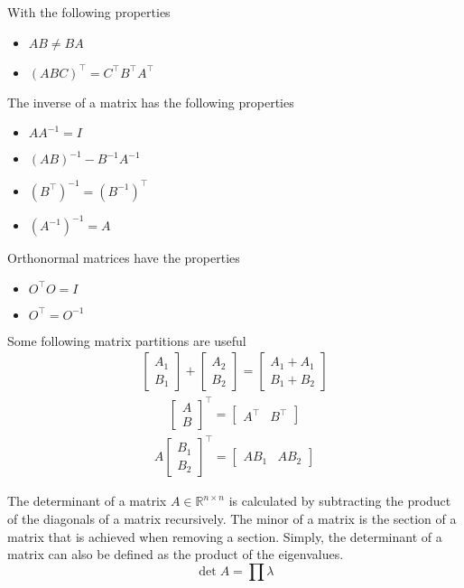 With the following properties
\begin{itemize}
  \item $AB \neq BA$
  \item $(ABC)^\top = C^\top B^\top A^\top $
\end{itemize}
The inverse of a matrix has the following properties
\begin{itemize}
  \item $AA^{-1} = I$
  \item $(AB)^{-1} - B^{-1} A^{-1}$
  \item $(B^\top)^{-1} = (B^{-1})^\top$
  \item $(A^{-1})^{-1} = A$
\end{itemize}
Orthonormal matrices have the properties
\begin{itemize}
  \item $O^\top O = I$
  \item $O^\top = O^{-1}$
\end{itemize}
Some following matrix partitions are useful
\begin{align}
  \begin{bmatrix}
     A_1 \\
     B_1
  \end{bmatrix}
  +
  \begin{bmatrix}
    A_2 \\
    B_2
 \end{bmatrix}
 =
 \begin{bmatrix}
  A_1 + A_1\\
  B_1 + B_2
\end{bmatrix}
\end{align}
\begin{align}
  \begin{bmatrix}
     A \\
     B
  \end{bmatrix}^\top
  = 
  \begin{bmatrix}
    A^\top & B^\top
 \end{bmatrix}
\end{align}
\begin{align}
  A
  \begin{bmatrix}
    B_1 \\
    B_2
  \end{bmatrix}^\top
  = 
  \begin{bmatrix}
    A B_1 & A B_2
 \end{bmatrix}
\end{align}

The determinant of a matrix $A \in \mathbb{R}^{n \times n}$ is calculated by subtracting the product of the diagonals of a matrix recursively. The minor of a matrix is the section of a matrix that is achieved when removing a section. Simply, the determinant of a matrix can also be defined as the product of the eigenvalues.
\begin{equation}
  \det A = \prod \lambda
\end{equation}

